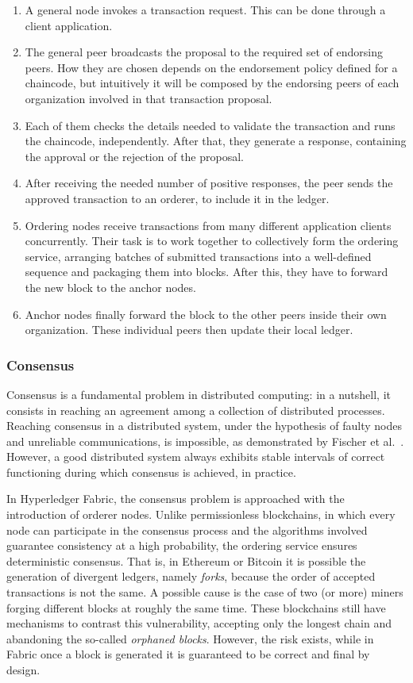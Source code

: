 \begin{enumerate}
    \item A general node invokes a transaction request. This can be done through a client application.
    \item The general peer broadcasts the proposal to the required set of endorsing peers. How they are chosen depends on the endorsement policy defined for a chaincode, but intuitively it will be composed by the endorsing peers of each organization involved in that transaction proposal.
    \item Each of them checks the details needed to validate the transaction and runs the chaincode, independently. After that, they generate a response, containing the approval or the rejection of the proposal. 
    \item After receiving the needed number of positive responses, the peer sends the approved transaction to an orderer, to include it in the ledger.
    \item Ordering nodes receive transactions from many different application clients concurrently. Their task is to work together to collectively form the ordering service, arranging batches of submitted transactions into a well-defined sequence and packaging them into blocks. After this, they have to forward the new block to the anchor nodes.
    \item Anchor nodes finally forward the block to the other peers inside their own organization. These individual peers then update their local ledger.
\end{enumerate}

\subsubsection{Consensus}
Consensus is a fundamental problem in distributed computing: in a nutshell, it consists in reaching an agreement among a collection of distributed processes.
Reaching consensus in a distributed system, under the hypothesis of faulty nodes and unreliable communications, is impossible, as demonstrated by Fischer et al.~\cite{consensus_impossible}. However, a good distributed system always exhibits stable intervals of correct functioning during which consensus is achieved, in practice.

In Hyperledger Fabric, the consensus problem is approached with the introduction of orderer nodes. Unlike permissionless blockchains, in which every node can participate in the consensus process and the algorithms involved guarantee consistency at a high probability, the ordering service ensures deterministic consensus. That is, in Ethereum or Bitcoin it is possible the generation of divergent ledgers, namely \emph{forks}, because the order of accepted transactions is not the same. A possible cause is the case of two (or more) miners forging different blocks at roughly the same time. These blockchains still have mechanisms to contrast this vulnerability, accepting only the longest chain and abandoning the so-called \emph{orphaned blocks}. However, the risk exists, while in Fabric once a block is generated it is guaranteed to be correct and final by design.

